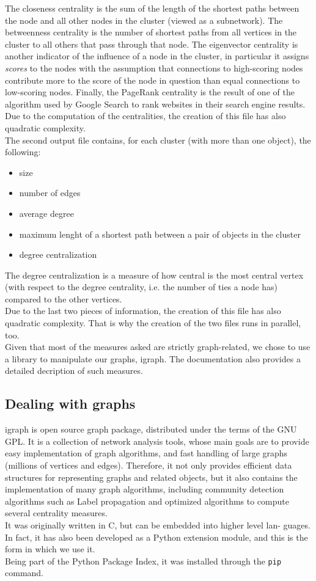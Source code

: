 \documentclass[a4paper,11pt]{book}
\begin{document}
The closeness centrality is the sum of the length of the shortest paths between the node and all other nodes in the cluster (viewed as a subnetwork). The betweenness centrality is the number of shortest paths from all vertices in the cluster to all others that pass through that node. The eigenvector centrality is another indicator of the influence of a node in the cluster, in particular it assigns \textit{scores} to the nodes with the assumption that connections to high-scoring nodes contribute more to the score of the node in question than equal connections to low-scoring nodes. Finally, the PageRank centrality is the result of one of the algorithm used by Google Search to rank websites in their search engine results.\\
Due to the computation of the centralities, the creation of this file has also quadratic complexity.\\

The second output file contains, for each cluster (with more than one object), the following:
\begin{itemize}
\item size
\item number of edges
\item average degree
\item maximum lenght of a shortest path between a pair of objects in the cluster
\item degree centralization
\end{itemize}
The degree centralization is a measure of how central is the most central vertex (with respect to the degree centrality, i.e. the number of ties a node has) compared to the other vertices.\\
Due to the last two pieces of information, the creation of this file has also quadratic complexity. That is why the creation of the two files runs in parallel, too.\\
Given that most of the measures asked are strictly graph-related, we chose to use a library to manipulate our graphs, igraph\cite{igr}. The documentation also provides a detailed decription of such measures.
\subsection{Dealing with graphs} 
  igraph is open source graph package, distributed under the terms of the GNU GPL.
  It is a collection of network analysis tools, whose main goals are to provide easy implementation  of graph algorithms, and fast handling of large graphs (millions of vertices and edges).
  Therefore, it not only provides efficient data structures for representing graphs
  and related objects, but it also contains the implementation of many graph
  algorithms, including community detection algorithms such as Label propagation and optimized algorithms to compute several centrality measures.\\
  It was originally written in C, but can be embedded into higher level lan-
  guages. In fact, it has also been developed as a Python extension module,
  and this is the form in which we use it.\\
Being part of the Python Package Index, it was installed through the \lstinline!pip! command.
\end{document}

